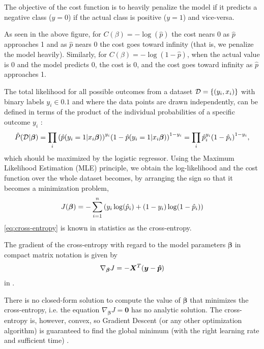 The objective of the cost function is to heavily penalize the model if it predicts a negative class ($y=0$) if the actual class is positive ($y=1$) and vice-versa. \cite{Hands-onML}

As seen in the above figure, for $C(\beta) = - \log(\hat{p})$ the cost nears 0 as $\hat{p}$ approaches 1 and as $\hat{p}$ nears 0 the cost goes toward infinity (that is, we penalize the model heavily). Similarly, for $C(\beta) = - \log(1 - \hat{p})$, when the actual value is 0 and the model predicts 0, the cost is 0, and the cost goes toward infinity as $\hat{p}$ approaches 1.

The total likelihood for all possible outcomes from a dataset $\mathcal{D} = \qty{\qty(y_i, x_i)}$ with binary labels $y_i \in \qty{0,1}$ and where the data points are drawn independently, can be defined in terms of the product of the individual probabilities of a specific outcome $y_i$ \cite{logreglec}:
\begin{equation}
    \hat{P} (\mathcal{D} | \bm{\beta}) = \prod_i \qty(\hat{p}\qty(y_i = 1 | x_i \bm{\beta}))^{y_i} \qty(1 - \hat{p}\qty(y_i = 1 | x_i \bm{\beta}))^{1-y_i} = \prod_i \hat{p}_i^{y_i} \qty(1 - \hat{p}_i)^{1-y_i},
\end{equation}
which should be maximized by the logistic regressor. Using the Maximum Likelihood Estimation (MLE) principle, we obtain the log-likelihood and the cost function over the whole dataset becomes, by arranging the sign so that it becomes a minimization problem,
\begin{equation}\label{eq:cross-entropy}
    J (\bm{\beta}) = - \sum_{i=1}^n \qty(y_i \log(\hat{p}_i) + (1-y_i) \log(1 - \hat{p}_i) )
\end{equation}
\autoref{eq:cross-entropy} is known in statistics as the cross-entropy.

The gradient of the cross-entropy with regard to the model parameters $\bm{\beta}$ in compact matrix notation is given by
\begin{equation}\label{eq:logcost deriv}
    \nabla_{\bm{\beta}} J = -\bm{X}^T \qty(\bm{y} -\bm{\hat{p}})
\end{equation}
in \cite{logreglec}.

There is no closed-form solution to compute the value of $\bm{\beta}$ that minimizes the cross-entropy, i.e. the equation $\nabla_{\bm{\beta}} J = \bm{0}$ has no analytic solution. The cross-entropy is, however, convex, so Gradient Descent (or any other optimization algorithm) is guaranteed to find the global minimum (with the right learning rate and sufficient time) \cite{Hands-onML}.

